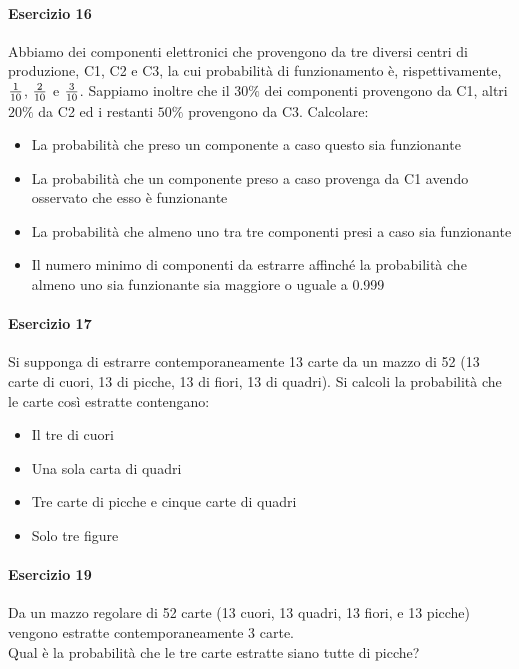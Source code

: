 \documentclass[12pt]{article}
\begin{document}
    \paragraph{Esercizio 16}
    Abbiamo dei componenti elettronici che provengono da tre diversi centri di produzione, C1, C2 e C3, la cui probabilità di funzionamento è, rispettivamente, $1\over10$, $2\over10$ e $3\over10$. Sappiamo inoltre che il $30\%$ dei componenti provengono da C1, altri $20\%$ da C2 ed i restanti $50\%$ provengono da C3. Calcolare:
    \begin{itemize}
        \item La probabilità che preso un componente a caso questo sia funzionante
        \item La probabilità che un componente preso a caso provenga da C1 avendo osservato che esso è funzionante
        \item La probabilità che almeno uno tra tre componenti presi a caso sia funzionante
        \item Il numero minimo di componenti da estrarre affinché la probabilità che almeno uno sia funzionante sia maggiore o uguale a 0.999
    \end{itemize}
    \paragraph{Esercizio 17}
    Si supponga di estrarre contemporaneamente 13 carte da un mazzo di 52 (13 carte di cuori, 13 di picche, 13 di fiori, 13 di quadri). Si calcoli la probabilità che le carte così estratte contengano:
    \begin{itemize}
        \item Il tre di cuori
        \item Una sola carta di quadri
        \item Tre carte di picche e cinque carte di quadri
        \item Solo tre figure
    \end{itemize}
    \paragraph{Esercizio 19}
    Da un mazzo regolare di 52 carte (13 cuori, 13 quadri, 13 fiori, e 13 picche) vengono estratte contemporaneamente 3 carte.
    \\Qual è la probabilità che le tre carte estratte siano tutte di picche?
    \newpage
\end{document}
